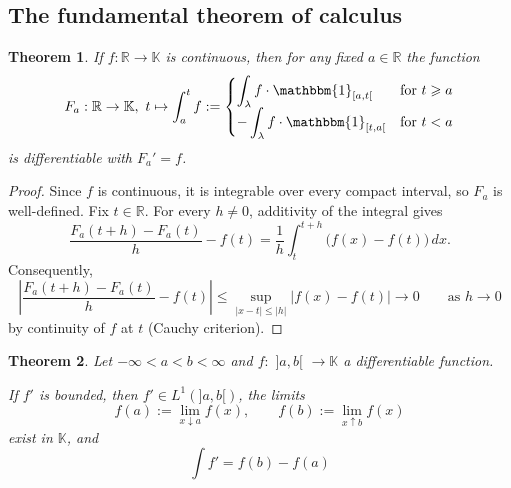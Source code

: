 \documentclass[11pt, a4paper, openany]{book}
\newtheorem{thm}{Theorem}\newtheorem{lem}{Lemma}\newtheorem{crl}{Corollary}
\theoremstyle{definition}
\begin{document}
\subsection{The fundamental theorem of calculus}
    \begin{thm}\label{antiderivative of a continuous function}
        If $f:\mathbb{R}\rightarrow \mathbb{K}$ is continuous, then for any fixed $a\in\mathbb{R}$ the function
        \[
            F_a:\mathbb{R}\rightarrow \mathbb{K},\,\,t\mapsto \int_a^t f:=\begin{cases}
                \displaystyle\int_{\lambda}f\cdot\mathbbm{1}_{[a,t[} & \text{for }t\geqslant a\\
                -\displaystyle\int_{\lambda}f\cdot\mathbbm{1}_{[t,a[} & \text{for }t< a
            \end{cases}
        \]
        is differentiable with $F_a'=f$.
    \end{thm}
    \begin{proof}
        Since $f$ is continuous, it is integrable over every compact
        interval, so $F_a$ is well-defined.
        Fix $t\in\mathbb{R}$. For every $h\neq0$, additivity of
        the integral gives
        \[
            \frac{F_a(t+h)-F_a(t)}{h}-f(t)
            =\frac1h\int_t^{t+h}\bigl(f(x)-f(t)\bigr)\,dx.
        \]
        Consequently,
        \[
            \left|
                \frac{F_a(t+h)-F_a(t)}{h}-f(t)
            \right|
            \leqslant
            \sup_{|x-t|\leqslant |h|}|f(x)-f(t)|
            \to 0
            \qquad \text{as }h\to0
        \]
        by continuity of $f$ at $t$ (Cauchy criterion).
    \end{proof}
    \begin{thm}
        Let $-\infty<a<b<\infty$ and $f:\,\,]a,b[\,\,\rightarrow\mathbb{K}$ a differentiable function.
        
        If $f'$ is bounded, then $f'\in L^1(]a,b[)$, the limits
        \[
            f(a):=\lim_{x\downarrow a}f(x),\qquad f(b):=\lim_{x\uparrow b}f(x)
        \]
        exist in $\mathbb{K}$, and
        \[
            \int f'=f(b)-f(a)
        \]
    \end{thm}
\end{document}
